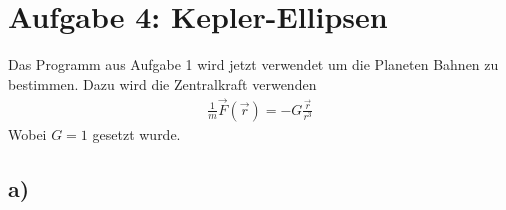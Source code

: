 
\section*{Aufgabe 4: Kepler-Ellipsen}
Das Programm aus Aufgabe 1 wird jetzt verwendet um die Planeten Bahnen zu bestimmen.
Dazu wird die Zentralkraft verwenden
\begin{align}
	\frac{1}{m}\vec{F}(\vec{r})=-G\frac{\vec{r}}{r^3}
\end{align}
Wobei $G=1$ gesetzt wurde.
\subsection*{a)}

